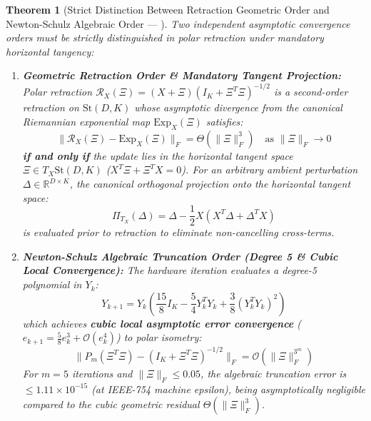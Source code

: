 \documentclass[journal,10pt,compsoc]{IEEEtran}
\theoremstyle{plain}
\newtheorem{theorem}{Theorem}
\theoremstyle{definition}
\begin{document}
\begin{theorem}[Strict Distinction Between Retraction Geometric Order and Newton-Schulz Algebraic Order --- \label{thm:polydim_0400}]
Two independent asymptotic convergence orders must be strictly distinguished in polar retraction under mandatory horizontal tangency:
\begin{enumerate}
    \item \textbf{Geometric Retraction Order \& Mandatory Tangent Projection:} Polar retraction $\mathcal{R}_X(\Xi) = (X + \Xi)(I_K + \Xi^T \Xi)^{-1/2}$ is a second-order retraction on $\mathrm{St}(D, K)$ whose asymptotic divergence from the canonical Riemannian exponential map $\mathrm{Exp}_X(\Xi)$ satisfies:
    \begin{equation}
    \|\mathcal{R}_X(\Xi) - \mathrm{Exp}_X(\Xi)\|_F = \Theta(\|\Xi\|_F^3) \quad \text{as } \|\Xi\|_F \to 0
    \end{equation}
    \textbf{if and only if} the update lies in the horizontal tangent space $\Xi \in T_X \mathrm{St}(D, K)$ ($X^T \Xi + \Xi^T X = 0$). For an arbitrary ambient perturbation $\Delta \in \mathbb{R}^{D \times K}$, the canonical orthogonal projection onto the horizontal tangent space:
    \begin{equation}
    \Pi_{T_X}(\Delta) = \Delta - \frac{1}{2} X \left(X^T \Delta + \Delta^T X\right)
    \end{equation}
    is evaluated prior to retraction to eliminate non-cancelling cross-terms.
    \item \textbf{Newton-Schulz Algebraic Truncation Order (Degree 5 \& Cubic Local Convergence):} The hardware iteration evaluates a degree-5 polynomial in $Y_k$:
    \begin{equation}
    Y_{k+1} = Y_k \left(\frac{15}{8} I_K - \frac{5}{4} Y_k^T Y_k + \frac{3}{8} (Y_k^T Y_k)^2\right)
    \end{equation}
    which achieves \textbf{cubic local asymptotic error convergence} ($e_{k+1} = \frac{5}{8} e_k^3 + \mathcal{O}(e_k^4)$) to polar isometry:
    \begin{equation}
    \|P_m(\Xi^T \Xi) - (I_K + \Xi^T \Xi)^{-1/2}\|_F = \mathcal{O}(\|\Xi\|_F^{3^m})
    \end{equation}
    For $m = 5$ iterations and $\|\Xi\|_F \le 0.05$, the algebraic truncation error is $\le 1.11 \times 10^{-15}$ (at IEEE-754 machine epsilon), being asymptotically negligible compared to the cubic geometric residual $\Theta(\|\Xi\|_F^3)$.

\end{enumerate}
\end{theorem}
\end{document}
